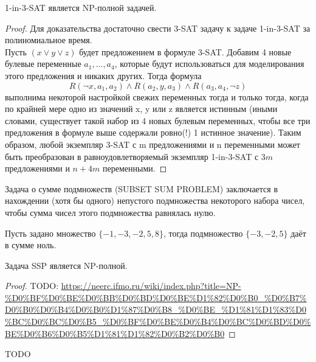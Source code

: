     \begin{Thm}
        1-in-3-SAT является NP-полной задачей.
    \end{Thm}
    \begin{proof}
        Для доказательства достаточно свести 3-SAT задачу к задаче 1-in-3-SAT за полиномиальное время.\\
        Пусть $(x \vee y \vee z)$ будет предложением в формуле 3-SAT. Добавим 4 новые булевые переменные $a_1, ..., a_4$, которые будут использоваться для моделирования этого предложения и никаких других. Тогда формула $$R(\neg x,a_1, a_2) \wedge R(a_2, y, a_3) \wedge R(a_3, a_4, \neg z)$$ выполнима некоторой настройкой свежих переменных тогда и только тогда, когда по крайней мере одно из значений x, y или z является истинным (иными словами, существует такой набор из 4 новых булевым переменных, чтобы все три предложения в формуле выше содержали ровно(!) 1 истинное значение). Таким образом, любой экземпляр 3-SAT с m предложениями и n переменными может быть преобразован в равноудовлетворяемый экземпляр 1-in-3-SAT с $3m$ предложениями и $n + 4m$ переменными.
    \end{proof}
    \begin{Def}
        Задача о сумме подмножеств (SUBSET SUM PROBLEM) заключается в нахождении (хотя бы одного) непустого подмножества некоторого набора чисел, чтобы сумма чисел этого подмножества равнялась нулю.
    \end{Def}
    \begin{Example}
        Пусть задано множество $\{-1, -3, -2, 5, 8\}$, тогда подмножество $\{-3, -2, 5\}$ даёт в сумме ноль.
    \end{Example}
    \begin{Thm}
        Задача SSP является NP-полной.
    \end{Thm}
    \begin{proof}
    TODO:
    \url{https://neerc.ifmo.ru/wiki/index.php?title=NP-%D0%BF%D0%BE%D0%BB%D0%BD%D0%BE%D1%82%D0%B0_%D0%B7%D0%B0%D0%B4%D0%B0%D1%87%D0%B8_%D0%BE_%D1%81%D1%83%D0%BC%D0%BC%D0%B5_%D0%BF%D0%BE%D0%B4%D0%BC%D0%BD%D0%BE%D0%B6%D0%B5%D1%81%D1%82%D0%B2%D0%B0}
    \end{proof}
    \begin{Def}
    TODO
    \end{Def}

